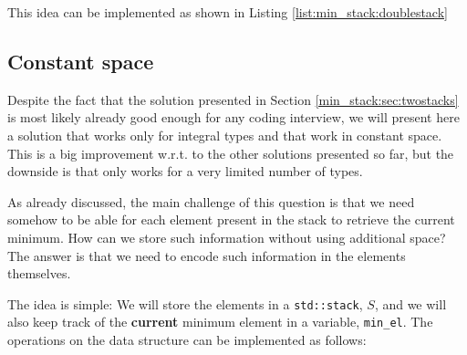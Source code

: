 This idea can be implemented as shown in Listing \ref{list:min_stack:doublestack}

 

\subsection{Constant space}
\label{min_stack:sec:constantspace}
Despite the fact that the solution presented in Section \ref{min_stack:sec:twostacks} is most likely already good enough for any coding interview, we will present here a solution that works only for integral types and that work in constant space. This is a big improvement w.r.t. to the other solutions presented so far, but the downside is that only works for a very limited number of types.

As already discussed, the main challenge of this question is that we need somehow to be able for each element present in the stack to retrieve the current minimum. How can we store such information without using additional space? The answer is that we need to encode such information  in the elements themselves. 

The idea is simple: We will store the elements in a \lstinline[columns=fixed]{std::stack}, $S$, and we will also keep track of the \textbf{current} minimum element in a variable, \lstinline[columns=fixed]{min_el}. The operations on the data structure can be implemented as follows:


